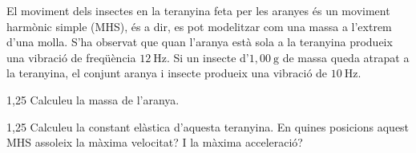 El moviment dels insectes en la teranyina feta per les aranyes és un moviment harmònic simple (MHS), és a dir, es pot modelitzar com una massa a l'extrem d'una molla. S'ha observat que quan l'aranya està sola a la teranyina produeix una vibració de freqüència $12\ \mathrm{Hz}$. Si un insecte d'$1,00\ \mathrm{g}$ de massa queda atrapat a la teranyina, el conjunt aranya i insecte produeix una vibració de $10\ \mathrm{Hz}$.

\begin{apartat}{1,25}
Calculeu la massa de l'aranya.
\end{apartat}

\begin{apartat}{1,25}
Calculeu la constant elàstica d'aquesta teranyina. En quines posicions aquest MHS assoleix la màxima velocitat? I la màxima acceleració?
\end{apartat}
